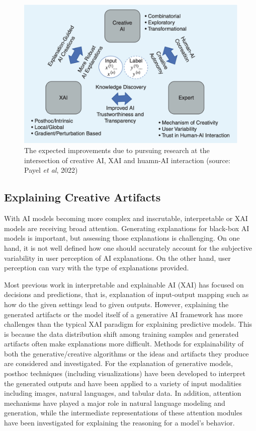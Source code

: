 \documentclass[]{article}
\newcommand{\etal}{\textit{et al}}
\begin{document}
\begin{figure}[!ht]
\centering
\includegraphics[width=\textwidth]{FIGS/ai_improve.png}
\caption{The expected improvements due to pursuing research at the intersection of creative AI, XAI and huamn-AI interaction (source: Payel \etal, 2022\cite{b1})}
\label{fig:ai}
\end{figure}



\subsection{Explaining Creative Artifacts}
With AI models becoming more complex and inscrutable, interpretable or XAI models are receiving broad attention. 
Generating explanations for black-box AI models is important, but assessing those explanations is challenging.
On one hand, it is not well defined how one should accurately account for the subjective variability in user perception of AI explanations. 
On the other hand, user perception can vary with the type of explanations provided. 

Most previous work in interpretable and explainable AI (XAI) has focused on decisions and predictions, that is, explanation of input-output mapping such as how do the given settings lead to given outputs. 
However, explaining the generated artifacts or the model itself of a generative AI framework has more challenges than the typical XAI paradigm for explaining predictive models. 
This is because the data distribution shift among training samples and generated artifacts often make explanations more difficult.
Methods for explainability of both the generative/creative algorithms or the ideas and artifacts they produce are considered and investigated. 
For the explanation of generative models, posthoc techniques (including visualizations) have been developed to interpret the generated outputs and have been applied to a variety of input modalities including images, natural languages, and tabular data. 
In addition, attention mechanisms\cite{b2} have played a major role in natural language modeling and generation, while the intermediate representations of these attention modules have been investigated for explaining the reasoning for a model's behavior. 
\end{document}
